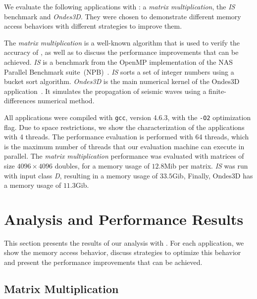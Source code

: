 We evaluate the following applications with \TABARNAC: a \emph{matrix multiplication}, the \emph{IS} benchmark and \emph{Ondes3D}.
They were chosen to demonstrate different memory access behaviors with different strategies to improve them.

The \emph{matrix multiplication} is a well-known algorithm that is used to verify the accuracy of \TABARNAC, as well as to discuss the performance improvements that can be achieved.
\emph{IS} is a benchmark from the OpenMP implementation of the NAS Parallel Benchmark suite~(NPB)~\cite{Jin1999}. \emph{IS} sorts a set of integer numbers using a bucket sort algorithm.
\emph{Ondes3D} is the main numerical kernel of the Ondes3D application~\cite{Dupros2008}. It simulates the propagation of seismic waves using a finite-differences numerical method.

All applications were compiled with \texttt{gcc}, version 4.6.3, with the \texttt{-O2} optimization flag.
Due to space restrictions, we show the characterization of the applications
with 4 threads.  The performance evaluation is performed with 64 threads,
which is the maximum number of threads that our evaluation machine can execute
in parallel.  The \emph{matrix multiplication} performance was evaluated with
matrices of size $4096 \times 4096$ doubles, for a memory usage of $12.8$Mib per matrix. \emph{IS} was run
with input class \emph{D}, resulting in a memory usage of $33.5$Gib, Finally, Ondes3D has a memory usage of $11.3$Gib.

\section{Analysis and Performance Results}
\label{sec:expe-analysis}

This section presents the results of our analysis with \TABARNAC.
For each application, we show the memory access behavior, discuss strategies to optimize this behavior and present the performance improvements that can be achieved.


\subsection{Matrix Multiplication}
\label{sec:exp-mat}

